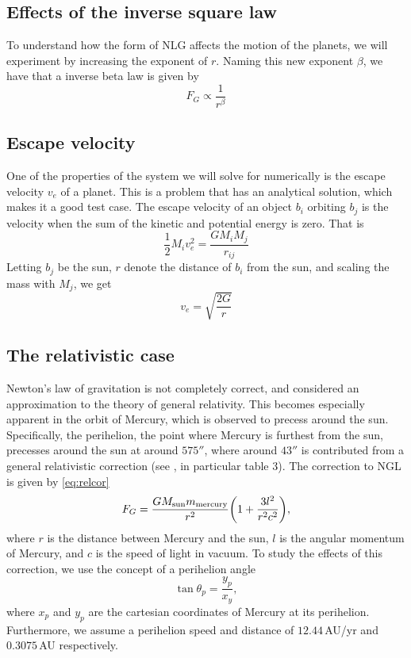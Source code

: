 \subsection{Effects of the inverse square law}
\label{sec:beta}
	To understand how the form of NLG affects the motion of the planets, we will
	experiment by increasing the exponent of $r$. Naming this new exponent $\beta$,
	we have that a inverse beta law is given by
	\begin{equation}
		\label{eq:beta}
			F_G \propto \frac{1}{r^\beta}
	\end{equation}

\subsection{Escape velocity}
One of the properties of the system we will solve for numerically is the escape velocity $v_e$ of a planet. This is a problem that has an analytical solution, which makes it a good test case. The escape velocity of an object $b_i$ orbiting $b_j$ is the velocity when the sum of the kinetic and potential energy is zero. That is
\begin{equation}
	\frac{1}{2}M_iv_e^2 = \frac{GM_iM_j}{r_{ij}}
\end{equation}
Letting $b_j$ be the sun, $r$ denote the distance of $b_i$ from the sun, and scaling the mass with $M_j$, we get
\begin{equation}
	\label{eq:esc}
	v_e = \sqrt{\frac{2G}{r}}
\end{equation}

\subsection{The relativistic case}
\label{sec:rel}
Newton's law of gravitation is not completely correct, and considered an approximation
to the theory of general relativity. This becomes especially apparent in the orbit of
Mercury, which is observed to precess around the sun. Specifically, the perihelion, the point where Mercury is furthest from the sun, precesses around the sun at around $575''$, where around $43''$ is
contributed from a general relativistic correction (see \cite{precession}, in particular table 3).
The correction to NGL is given by \ref{eq:relcor}
	\begin{equation}
		\label{eq:relcor}
		F_G = \frac{GM_{\text{sun}}m_{\text{mercury}}}{r^2}\qty(1 + \frac{3l^2}{r^2c^2}),
	\end{equation}
where $r$ is the distance between Mercury and the sun, $l$ is the angular momentum of
Mercury, and $c$ is the speed of light in vacuum. To study the effects of this
correction, we use the concept of a perihelion angle
	\begin{equation}
		\label{eq:perangle}
		\tan{\theta_p} = \frac{y_p}{x_y},
	\end{equation}
where $x_p$ and $y_p$ are the cartesian coordinates of Mercury at its perihelion.
Furthermore, we assume a perihelion speed and distance of $12.44\,$AU/yr and $0.3075\,$AU
respectively.

